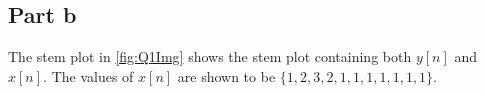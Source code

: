 \subsection{Part b}

The stem plot in \ref{fig:Q1Img} shows the stem plot containing both $y[n]$ and
$x[n]$. The values of $x[n]$ are shown to be $\{1,2,3,2,1,1,1,1,1,1,1\}$.
